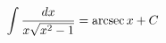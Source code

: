 \documentclass[preview]{standalone}
\begin{document}
\begin{align*}
\special{dvisvgm:raw <g id='unique000'>}\int \frac{dx}{x\sqrt{x^2-1}} = \text{arcsec}\, x + C\special{dvisvgm:raw </g>}
\end{align*}
\end{document}
